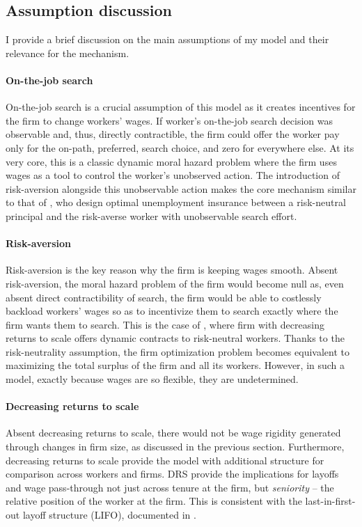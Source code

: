 \subsection{Assumption discussion}\label{model:ass_disc}
I provide a brief discussion on the main assumptions of my model and their relevance for the mechanism.

\paragraph{On-the-job search}
On-the-job search is a crucial assumption of this model as it creates incentives for the firm to change workers' wages. If worker's on-the-job search decision was observable and, thus, directly contractible, the firm could offer the worker pay only for the on-path, preferred, search choice, and zero for everywhere else. 
At its very core, this is a classic dynamic moral hazard problem where the firm uses wages as a tool to control the worker's unobserved action. The introduction of risk-aversion alongside this unobservable action makes the core mechanism similar to that of \textcite{hopenhayn1997}, who design optimal unemployment insurance between a risk-neutral principal and the risk-averse worker with unobservable search effort. 

\paragraph{Risk-aversion}
Risk-aversion is the key reason why the firm is keeping wages smooth. Absent risk-aversion, the moral hazard problem of the firm would become null as, even absent direct contractibility of search, the firm would be able to costlessly backload workers' wages so as to incentivize them to search exactly where the firm wants them to search. This is the case of \textcite{schaal2017}, where firm with decreasing returns to scale offers dynamic contracts to risk-neutral workers. Thanks to the risk-neutrality assumption, the firm optimization problem becomes equivalent to maximizing the total surplus of the firm and all its workers. However, in such a model, exactly because wages are so flexible, they are undetermined.

\paragraph{Decreasing returns to scale}
Absent decreasing returns to scale, there would not be wage rigidity generated through changes in firm size, as discussed in the previous section. Furthermore, decreasing returns to scale provide the model with additional structure for comparison across workers and firms. DRS provide the implications for layoffs and wage pass-through not just across tenure at the firm, but \emph{seniority} -- the relative position of the worker at the firm. This is consistent with the last-in-first-out layoff structure (LIFO), documented in \textcite{buhai2014}.

